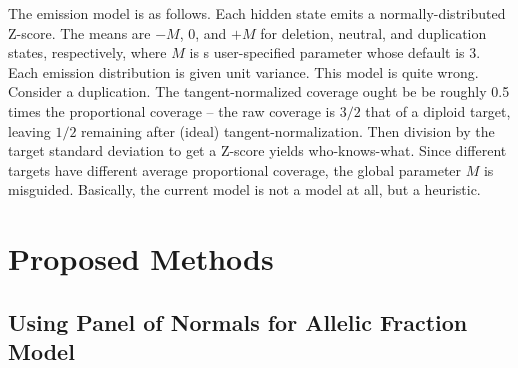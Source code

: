 \documentclass[nofootinbib,amssymb,amsmath]{revtex4}
\begin{document}
The emission model is as follows.  Each hidden state emits a normally-distributed Z-score.  The means are $-M$, 0, and $+M$ for deletion, neutral, and duplication states, respectively, where $M$ is s user-specified parameter whose default is 3.  Each emission distribution is given unit variance.  This model is quite wrong.  Consider a duplication.  The tangent-normalized coverage ought be be roughly 0.5 times the proportional coverage -- the raw coverage is $3/2$ that of a diploid target, leaving $1/2$ remaining after (ideal) tangent-normalization.  Then division by the target standard deviation to get a Z-score yields who-knows-what.  Since different targets have different average proportional coverage, the global parameter $M$ is misguided.  Basically, the current model is not a model at all, but a heuristic.


\section{Proposed Methods} \label{proposed-methods} 

\subsection{Using Panel of Normals for Allelic Fraction Model} \label{allelic-PoN}
\end{document}
